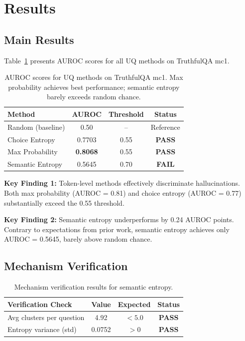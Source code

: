 \section{Results}
\label{sec:results}

\subsection{Main Results}

Table~\ref{tab:main} presents AUROC scores for all UQ methods on TruthfulQA mc1.

\begin{table}[h]
\centering
\begin{tabular}{lccc}
\toprule
\textbf{Method} & \textbf{AUROC} & \textbf{Threshold} & \textbf{Status} \\
\midrule
Random (baseline) & 0.50 & -- & Reference \\
Choice Entropy & 0.7703 & 0.55 & \textbf{PASS} \\
Max Probability & \textbf{0.8068} & 0.55 & \textbf{PASS} \\
Semantic Entropy & 0.5645 & 0.70 & \textbf{FAIL} \\
\bottomrule
\end{tabular}
\caption{AUROC scores for UQ methods on TruthfulQA mc1. Max probability achieves best performance; semantic entropy barely exceeds random chance.}
\label{tab:main}
\end{table}

\textbf{Key Finding 1:} Token-level methods effectively discriminate hallucinations. Both max probability (AUROC = 0.81) and choice entropy (AUROC = 0.77) substantially exceed the 0.55 threshold.

\textbf{Key Finding 2:} Semantic entropy underperforms by 0.24 AUROC points. Contrary to expectations from prior work, semantic entropy achieves only AUROC = 0.5645, barely above random chance.

\subsection{Mechanism Verification}

\begin{table}[h]
\centering
\begin{tabular}{lccc}
\toprule
\textbf{Verification Check} & \textbf{Value} & \textbf{Expected} & \textbf{Status} \\
\midrule
Avg clusters per question & 4.92 & $< 5.0$ & \textbf{PASS} \\
Entropy variance (std) & 0.0752 & $> 0$ & \textbf{PASS} \\
\bottomrule
\end{tabular}
\caption{Mechanism verification results for semantic entropy.}
\label{tab:verification}
\end{table}

